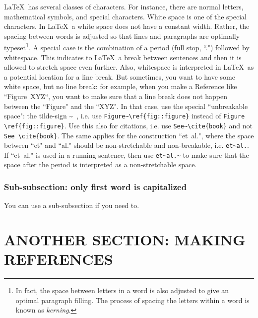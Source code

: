 \documentclass[12pt]{article}
\begin{document}
\LaTeX\ has several classes of characters. For instance, there are normal letters, mathematical symbols, and special characters. White space is one of the special characters. In \LaTeX\, a white space does not have a constant width. Rather, the spacing between words is adjusted so that lines and paragraphs are optimally typeset\footnote{In fact, the space between letters in a word is also adjusted to give an optimal paragraph filling. The process of spacing the letters within a word is known as \emph{kerning}.}. A special case is the combination of a period (full stop, ``.") followed by whitespace. This indicates to \LaTeX\ a break between sentences and then it is allowed to stretch space even further. Also, whitespace is interpreted in \LaTeX\ as a potential location for a line break. But sometimes, you want to have some white space, but no line break: for example, when you make a Reference like ``Figure~XYZ``, you want to make sure that a line break does not happen between the ``Figure" and the ``XYZ". In that case, use the special ``unbreakable space": the tilde-sign \~~, i.e. use \verb|Figure~\ref{fig::figure}| instead of \verb|Figure \ref{fig::figure}|. Use this also for citations, i.e. use \verb|See~\cite{book}| and not \verb|See \cite{book}|. The same applies for the construction ``et~al.", where the space between ``et" and ``al." should be non-stretchable and non-breakable, i.e. \verb|et~al.|. If ``et~al." is used in a running sentence, then use \verb|et~al.~| to make sure that the space after the period is interpreted as a non-stretchable space.

%
\subsubsection{Sub-subsection: only first word is capitalized} 
\label{subsubsect::minor}

You can use a sub-subsection if you need to.

%
\section{ANOTHER SECTION: MAKING REFERENCES} 
\label{sect::references}
\end{document}

